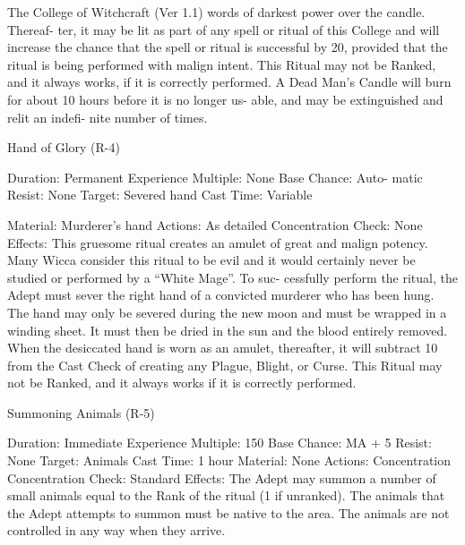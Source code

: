 \begin{Chapter}{The College of Witchcraft (Ver 1.1)}
words  of  darkest  power  over  the  candle.  Thereaf-
ter, it may be lit as part of any spell or ritual of this 
College and will increase the chance that the spell 
or ritual is successful by 20, provided that the ritual 
is being performed with malign intent. This Ritual 
may  not  be  Ranked,  and  it  always  works,  if  it  is 
correctly  performed.  A  Dead  Man’s  Candle  will 
burn  for  about  10  hours  before  it  is  no  longer  us-
able,  and  may  be  extinguished  and  relit  an  indefi-
nite number of times. 

Hand of Glory (R-4) 

Duration: Permanent 
Experience  Multiple:  None  Base  Chance:  Auto-
matic 
Resist: None 
Target: Severed hand 
Cast Time: Variable 

Material: Murderer’s hand 
Actions: As detailed 
Concentration Check: None 
Effects:  This  gruesome  ritual  creates  an  amulet  of 
great  and  malign  potency.  Many  Wicca  consider 
this ritual to be evil and it would certainly never be 
studied  or  performed  by  a  “White Mage”.  To  suc-
cessfully  perform  the  ritual,  the  Adept  must  sever 
the  right  hand  of  a  convicted  murderer  who  has 
been  hung.  The  hand  may  only  be  severed  during 
the  new  moon  and  must  be  wrapped  in  a  winding 
sheet. It must then be dried in the sun and the blood 
entirely  removed.  When  the  desiccated  hand  is 
worn  as  an  amulet,  thereafter,  it  will  subtract  10 
from  the  Cast  Check  of  creating  any  Plague, 
Blight,  or  Curse.  This  Ritual  may  not  be  Ranked, 
and it always works if it is correctly performed. 

Summoning Animals (R-5) 

Duration: Immediate 
Experience Multiple: 150 
Base Chance: MA + 5%
Resist: None 
Target: Animals 
Cast Time: 1 hour 
Material: None 
Actions: Concentration 
Concentration Check: Standard 
Effects:  The  Adept  may  summon  a  number  of 
small  animals  equal  to  the  Rank  of  the  ritual  (1  if 
unranked).  The animals that  the  Adept  attempts to 
summon  must  be  native  to  the  area.  The  animals 
are not controlled in any way when they arrive. 

\end{Chapter}
